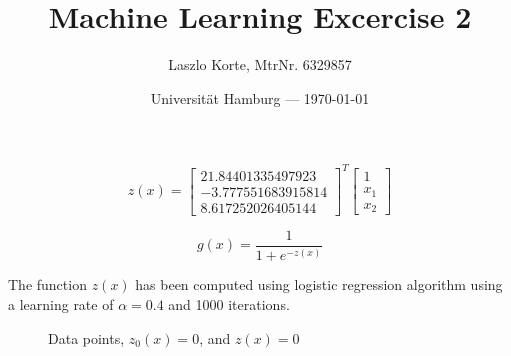 \documentclass[parskip=half,a4paper]{scrartcl}
\title{Machine Learning Excercise 2}
\author{Laszlo Korte, MtrNr. 6329857}
\date{Universität Hamburg --- \today}
\begin{document}
\maketitle

$$
z(x) = \begin{bmatrix}
21.84401335497923 \\
-3.777551683915814 \\
8.617252026405144
\end{bmatrix}^T
\begin{bmatrix}
1 \\
x_1 \\
x_2
\end{bmatrix}
$$

$$
g(x) = \frac{1}{1 + e^{-z(x)}}
$$


The function $z(x)$ has been computed using logistic regression algorithm using a learning rate of $\alpha = 0.4$ and 1000 iterations.

\begin{figure}[H]
\begin{center}

\caption{Data points, $z_0(x) = 0$, and $z(x) = 0$}
\end{center}
\end{figure}
\end{document}
